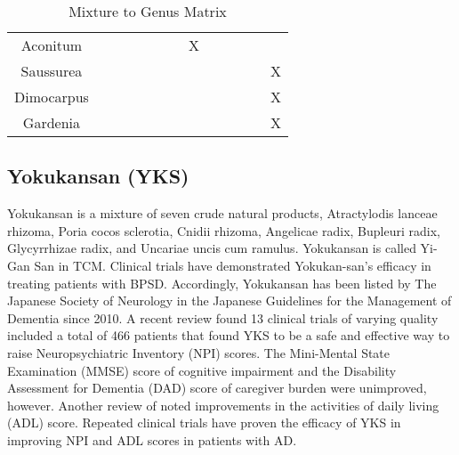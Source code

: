 \begin{table*}[htp]
\begin{tabular}{||c c c c c c c c c c c c c||}
 Aconitum       &     &     &     &      &     &    &  X  &     &      &      &     &     \\



 Saussurea      &     &     &     &      &     &    &     &     &      &      &     &  X   \\
 Dimocarpus     &     &     &     &      &     &    &     &     &      &      &     &  X   \\
 Gardenia       &     &     &     &      &     &    &     &     &      &      &     &  X   \\

 \hline
\end{tabular}
\caption{Mixture to Genus Matrix}
\label{table:mixtures}
\end{table*}



\subsection{Yokukansan (YKS)}
Yokukansan is a mixture of seven crude natural products,
Atractylodis lanceae rhizoma,
Poria cocos sclerotia,
Cnidii rhizoma,
Angelicae radix,
Bupleuri radix,
Glycyrrhizae radix,
and Uncariae uncis cum ramulus.
Yokukansan is called Yi-Gan San in TCM.
\cite{iwasaki2005randomized}
Clinical trials have demonstrated Yokukan-san’s efficacy
in treating patients with BPSD. Accordingly,
Yokukansan has been listed by The Japanese Society of Neurology
in the Japanese Guidelines for the Management of Dementia
since 2010.
A recent review found 13 clinical trials of varying quality
included a total of 466 patients that found YKS to be a safe
and effective way to raise Neuropsychiatric Inventory (NPI) scores.
The Mini-Mental State Examination (MMSE) score of cognitive impairment
and the Disability Assessment for Dementia (DAD) score of caregiver burden
were unimproved, however.
\cite{okamoto2014yokukan}
Another review of noted improvements in the activities of daily living (ADL) score.
\cite{matsuda2013yokukansan}
Repeated clinical trials have proven the efficacy of YKS in improving
NPI and ADL scores in patients with AD.
\cite{mizukami2014kampo}


